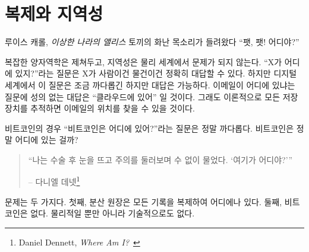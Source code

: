 \chapter{복제와 지역성}
\label{les:3}

\begin{chapquote}{루이스 캐롤, \textit{이상한 나라의 앨리스}}
토끼의 화난 목소리가 들려왔다 \enquote{팻, 팻! 어디야?}
\end{chapquote}

복잡한 양자역학은 제쳐두고, 지역성은 물리 세계에서 문제가 되지 않는다. \enquote{X가 어디에 있지?}라는 
질문은 X가 사람이건 물건이건 정확히 대답할 수 있다. 하지만 디지털 세계에서 이 질문은 
조금 까다롭긴 하지만 대답은 가능하다. 이메일이 어디에 있냐는 질문에 성의 없는 대답은 \enquote{클라우드에 있어} 일 것이다.
그래도 이론적으로 모든 저장장치를 추적하면 이메일의 위치를 찾을 수 있을 것이다.

비트코인의 경우 \enquote{비트코인은 어디에 있어?}라는 질문은 정말 까다롭다. 비트코인은 정말 어디에 있는 걸까?

\begin{quotation}\begin{samepage}
\enquote{나는 수술 후 눈을 뜨고 주의를 둘러보며 수 없이 물었다. `여기가 어디야?'}
\begin{flushright} -- 다니엘 데넷\footnote{Daniel Dennett, \textit{Where Am I?}~\cite{where-am-i}}
\end{flushright}\end{samepage}\end{quotation}

문제는 두 가지다. 첫째, 분산 원장은 모든 기록을 복제하여 어디에나 있다. 둘째, 비트코인은 없다. 
물리적일 뿐만 아니라 기술적으로도 없다.

